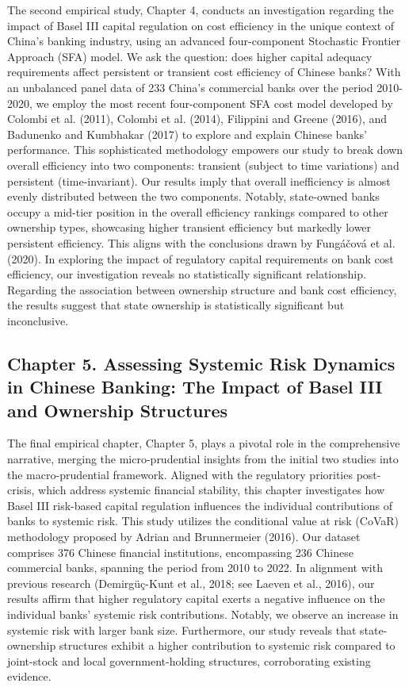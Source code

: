 \documentclass[
  letterpaper,
  DIV=11,
  numbers=noendperiod]{scrreprt}
\begin{document}
The second empirical study, Chapter 4, conducts an investigation
regarding the impact of Basel III capital regulation on cost efficiency
in the unique context of China's banking industry, using an advanced
four-component Stochastic Frontier Approach (SFA) model. We ask the
question: does higher capital adequacy requirements affect persistent or
transient cost efficiency of Chinese banks? With an unbalanced panel
data of 233 China's commercial banks over the period 2010-2020, we
employ the most recent four-component SFA cost model developed by
Colombi et al. (2011), Colombi et al. (2014), Filippini and Greene
(2016), and Badunenko and Kumbhakar (2017) to explore and explain
Chinese banks' performance. This sophisticated methodology empowers our
study to break down overall efficiency into two components: transient
(subject to time variations) and persistent (time-invariant). Our
results imply that overall inefficiency is almost evenly distributed
between the two components. Notably, state-owned banks occupy a mid-tier
position in the overall efficiency rankings compared to other ownership
types, showcasing higher transient efficiency but markedly lower
persistent efficiency. This aligns with the conclusions drawn by
Fungáčová et al. (2020). In exploring the impact of regulatory capital
requirements on bank cost efficiency, our investigation reveals no
statistically significant relationship. Regarding the association
between ownership structure and bank cost efficiency, the results
suggest that state ownership is statistically significant but
inconclusive.

\subsection{Chapter 5. Assessing Systemic Risk Dynamics in Chinese
Banking: The Impact of Basel III and Ownership
Structures}\label{chapter-5.-assessing-systemic-risk-dynamics-in-chinese-banking-the-impact-of-basel-iii-and-ownership-structures}

The final empirical chapter, Chapter 5, plays a pivotal role in the
comprehensive narrative, merging the micro-prudential insights from the
initial two studies into the macro-prudential framework. Aligned with
the regulatory priorities post-crisis, which address systemic financial
stability, this chapter investigates how Basel III risk-based capital
regulation influences the individual contributions of banks to systemic
risk. This study utilizes the conditional value at risk (CoVaR)
methodology proposed by Adrian and Brunnermeier (2016). Our dataset
comprises 376 Chinese financial institutions, encompassing 236 Chinese
commercial banks, spanning the period from 2010 to 2022. In alignment
with previous research (Demirgüç-Kunt et al., 2018; see Laeven et al.,
2016), our results affirm that higher regulatory capital exerts a
negative influence on the individual banks' systemic risk contributions.
Notably, we observe an increase in systemic risk with larger bank size.
Furthermore, our study reveals that state-ownership structures exhibit a
higher contribution to systemic risk compared to joint-stock and local
government-holding structures, corroborating existing evidence.
\end{document}
